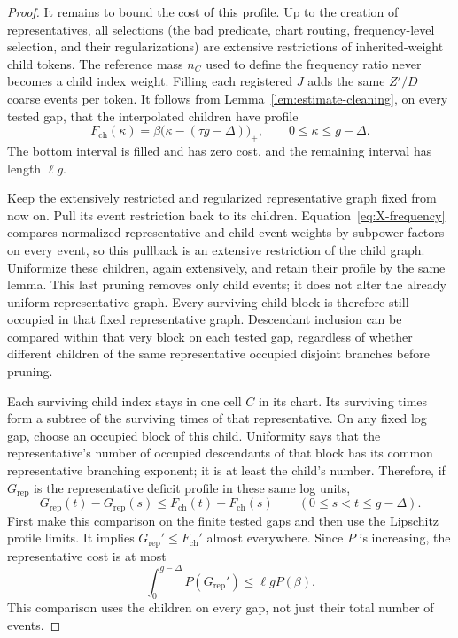 \begin{proof}
It remains to bound the cost of this profile. Up to the
creation of representatives, all selections (the bad predicate,
chart routing, frequency-level selection, and their regularizations)
are extensive restrictions of inherited-weight child tokens. The
reference mass $n_C$ used to define the frequency ratio never becomes
a child index weight. Filling each registered $J$ adds the same
$Z'/D$ coarse events per token. It follows from
Lemma~\ref{lem:estimate-cleaning}, on every tested gap, that the
interpolated children have profile
\begin{equation}
 F_{\mathrm{ch}}(\kappa)
 =\beta\bigl(\kappa-(\tau g-\Delta)\bigr)_+,
 \qquad 0\le\kappa\le g-\Delta.
\label{eq:X-child-profile}
\end{equation}
The bottom interval is filled and has zero cost, and the remaining
interval has length $\ell g$.

Keep the extensively restricted and regularized representative graph
fixed from now on. Pull its event restriction back to its children.
Equation~\eqref{eq:X-frequency} compares normalized representative
and child event weights by subpower factors on every event, so this
pullback is an extensive restriction of the child graph. Uniformize
these children, again extensively, and retain their profile by the
same lemma. This last pruning removes only child events; it does not
alter the already uniform representative graph. Every surviving
child block is therefore still occupied in that fixed representative
graph. Descendant inclusion can be compared within that very block
on each tested gap, regardless of whether different children of the
same representative occupied disjoint branches before pruning.

Each surviving child index stays in one cell $C$ in its chart. Its
surviving times form a subtree of the surviving times of that
representative. On any fixed log gap, choose an occupied block of
this child. Uniformity says that the representative's number of
occupied descendants of that block has its common representative
branching exponent; it is at least the child's number. Therefore,
if $G_{\mathrm{rep}}$ is the representative deficit profile in these
same log units,
\[
 G_{\mathrm{rep}}(t)-G_{\mathrm{rep}}(s)
 \le F_{\mathrm{ch}}(t)-F_{\mathrm{ch}}(s)
 \qquad(0\le s<t\le g-\Delta).
\]
First make this comparison on the finite tested gaps and then use
the Lipschitz profile limits. It implies
$G_{\mathrm{rep}}'\le F_{\mathrm{ch}}'$ almost everywhere. Since
$P$ is increasing, the representative cost is at most
\begin{equation}
 \int_0^{g-\Delta}P(G_{\mathrm{rep}}')
 \le \ell gP(\beta).
\label{eq:X-representative-cost}
\end{equation}
This comparison uses the children on every gap, not just their total
number of events.


\end{proof}
